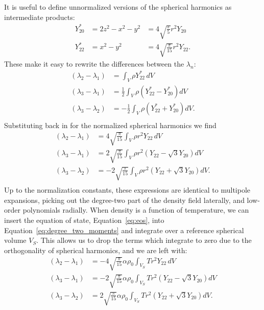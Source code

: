 \documentclass[preprint,12pt,authoryear]{elsarticle}
\begin{document}
It is useful to define unnormalized versions of the spherical harmonics as intermediate products:
\begin{equation}
\begin{aligned}
Y_{20}^* &= 2 z^2 - x^2 - y^2 &= 4 \sqrt{ \frac{\pi}{5} } r^2 Y_{20} \\ 
Y_{22}^* &= x^2 - y^2 &= 4 \sqrt{ \frac{\pi}{15} } r^2 Y_{22}.
\end{aligned}
\end{equation}
These make it easy to rewrite the differences between the $\lambda_n$:
\begin{equation}
\begin{aligned}
(\lambda_2 - \lambda_1) &= \int_V \rho Y_{22}^* \, dV \\
(\lambda_3 - \lambda_1) &= \frac{1}{2} \int_V  \rho \left( Y_{22}^* - Y_{20}^* \right) dV \\
(\lambda_3 - \lambda_2) &= -\frac{1}{2} \int_V \rho \left( Y_{22}^* + Y_{20}^*  \right) dV. \\
\end{aligned}
\end{equation}
Substituting back in for the normalized spherical harmonics we find
\fi
\begin{equation}
\begin{aligned}
(\lambda_2 - \lambda_1) &= 4 \sqrt{\frac{\pi}{15} } \int_V   \rho r^2  Y_{22} \,dV \\
(\lambda_3 - \lambda_1) &= 2 \sqrt{ \frac{\pi}{15} } \int_V  \rho r^2 \left( Y_{22} - \sqrt{3} Y_{20} \right) dV \\
(\lambda_3 - \lambda_2) &= -2 \sqrt{ \frac{\pi}{15} } \int_V  \rho r^2 \left( Y_{22} + \sqrt{3} Y_{20} \right) dV. \\
\label{eq:degree_two_moments}
\end{aligned}
\end{equation}
Up to the normalization constants, these expressions are identical to multipole expansions, 
picking out the degree-two part of the density field laterally, and low-order polynomials radially.
When density is a function of temperature, we can insert the equation of state, Equation~\eqref{eq:eos}, into 
Equation~\eqref{eq:degree_two_moments} and integrate over a reference spherical volume $V_S$.
This allows us to drop the terms which integrate to zero due to the orthogonality of spherical harmonics, and we are left with:
\begin{equation}
\begin{aligned}
(\lambda_2 - \lambda_1) &= -4 \sqrt{\frac{\pi}{15} } \alpha \rho_0 \int_{V_S} T r^2  Y_{22} \,dV \\
(\lambda_3 - \lambda_1) &= -2 \sqrt{ \frac{\pi}{15} } \alpha \rho_0 \int_{V_S} T r^2 \left( Y_{22} - \sqrt{3} Y_{20} \right) dV \\
(\lambda_3 - \lambda_2) &= 2 \sqrt{ \frac{\pi}{15} } \alpha \rho_0 \int_{V_S}  T r^2 \left( Y_{22} + \sqrt{3} Y_{20} \right) dV. \\
\label{eq:degree_two_moments_of_temperature}
\end{aligned}
\end{equation}
\end{document}

